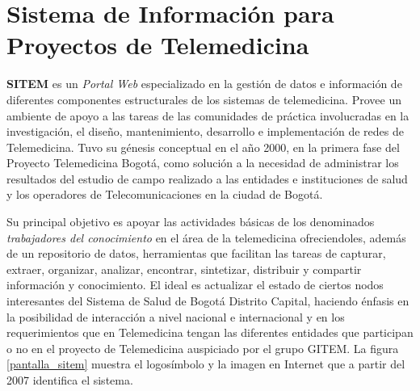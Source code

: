 \chapter{Sistema de Información para Proyectos de Telemedicina}

\textbf{SITEM }es un \textit{Portal Web} especializado en la gestión de datos e información de diferentes componentes estructurales de los sistemas de telemedicina. Provee un ambiente de apoyo a las tareas de las comunidades de práctica involucradas en la investigación, el diseño, mantenimiento, desarrollo e implementación de redes de Telemedicina. Tuvo su génesis conceptual en el año 2000, en la primera fase del Proyecto Telemedicina Bogotá, como solución a la necesidad de administrar los resultados del estudio de campo realizado a las entidades e instituciones de salud y los operadores de Telecomunicaciones en la ciudad de Bogotá.

Su principal objetivo es apoyar las actividades básicas de los denominados \textit{trabajadores del conocimiento} en el área de la telemedicina ofreciendoles, además de un repositorio de datos, herramientas que facilitan las tareas de capturar, extraer, organizar, analizar, encontrar, sintetizar, distribuir y compartir información y conocimiento. El ideal es actualizar el estado de ciertos nodos interesantes del Sistema de Salud de Bogotá Distrito Capital, haciendo énfasis en la posibilidad de interacción a nivel nacional e internacional y en los requerimientos que en Telemedicina tengan las diferentes entidades que participan o no en el proyecto de Telemedicina auspiciado por el grupo GITEM. La figura \ref{pantalla_sitem} muestra el logosímbolo y la imagen en Internet que a partir del 2007 identifica el sistema.

